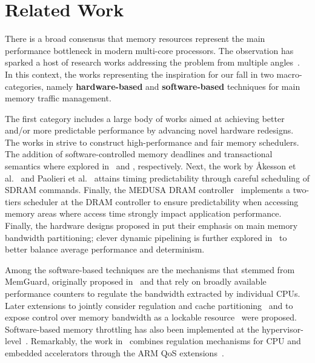 \section{Related Work}\label{sec:relwork}
There is a broad consensus that memory resources represent the main
performance bottleneck in modern multi-core processors. The
observation has sparked a host of research works addressing the
problem from multiple angles~\cite{temp_reg_survey}. In this context,
the works representing the inspiration for our \schim fall in two
macro-categories, namely \textbf{hardware-based} and
\textbf{software-based} techniques for main memory traffic management.

The first category includes a large body of works aimed at achieving
better and/or more predictable performance by advancing novel hardware
redesigns. The works in \cite{mutlu2007stall, mutlu2008parallelism,
  nesbit2006fair} strive to construct high-performance and fair memory
schedulers. The addition of software-controlled memory deadlines and
transactional semantics where explored in~\cite{usui2016dash} and
\cite{ferri2011soc}, respectively. Next, the work by Åkesson et
al.~\cite{akesson2007predator, akesson2010predictable} and Paolieri et
al.~\cite{paolieri2009analyzable} attains timing predictability
through careful scheduling of SDRAM commands. Finally, the MEDUSA DRAM
controller~\cite{valsan2015medusa, detmem2018} implements a two-tiers
scheduler at the DRAM controller to ensure predictability when
accessing memory areas where access time strongly impact application
performance. Finally, the hardware designs proposed in
\cite{zhou2016mitts, rafique2007effective, Farshchi2020BRUBR} put
their emphasis on main memory bandwidth partitioning; clever dynamic
pipelining is further explored in~\cite{drambulism2020rtas} to better
balance average performance and determinism.

Among the software-based techniques are the mechanisms that stemmed
from MemGuard, originally proposed in~\cite{memguard2013} and that
rely on broadly available performance counters to regulate the
bandwidth extracted by individual CPUs. Later extensions to jointly
consider regulation and cache partitioning~\cite{holistic2019rtas} and
to expose control over memory bandwidth as a lockable
resource~\cite{bwlockyun2017} were proposed. Software-based memory
throttling has also been implemented at the
hypervisor-level~\cite{xvisor2018, ewarp2020rtss}. Remarkably, the
work in~\cite{ewarp2020rtss} combines regulation mechanisms for CPU
and embedded accelerators through the ARM QoS
extensions~\cite{qos-400}.

